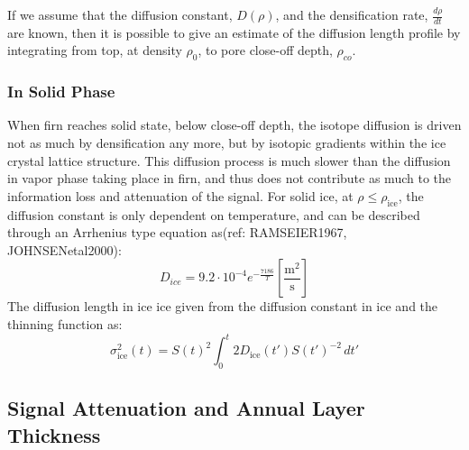 \documentclass[../../CompleteThesis2/Complete_2ndDraft]{subfiles}
\begin{document}
If we assume that the diffusion constant, $D(\rho)$, and the densification rate, $\frac{d\rho}{dt}$ are known, then it is possible to give an estimate of the diffusion length profile by integrating from top, at density $\rho_0$, to pore close-off depth, $\rho_{co}$.



\subsubsection{In Solid Phase}
\label{Subsubsec:Ice_DiffusionAndDensification_Diffusion_Ice}
When firn reaches solid state, below close-off depth, the isotope diffusion is driven not as much by densification any more, but by isotopic gradients within the ice crystal lattice structure. This diffusion process is much slower than the diffusion in vapor phase taking place in firn, and thus does not contribute as much to the information loss and attenuation of the signal. For solid ice, at $\rho \leq \rho_{\text{ice}}$, the diffusion constant is only dependent on temperature, and can be described through an Arrhenius type equation as(ref: RAMSEIER1967, JOHNSENetal2000):
\begin{equation}
	D_{ice} = 9.2 \cdot 10^{-4} e^{-\frac{7186}{T}} 	\left[\frac{\text{m}^2}{\text{s}}\right]
	\label{Eq:Ice_Diff_const}
\end{equation}
The diffusion length in ice ice given from the diffusion constant in ice and the thinning function as:
\begin{equation}
	\sigma^2_{\text{ice}}(t) = S(t)^2 \int_{0}^{t}2 D_{\text{ice}}(t') S(t')^{-2} \, dt'
	\label{Eq:Diff_Len_Ice}
\end{equation}

\subsection[Signal Attenuation and ALT]{Signal Attenuation and Annual Layer Thickness}
\label{Subsec:Ice_DiffusionAndDensification_SignalAttenuation}
\end{document}
